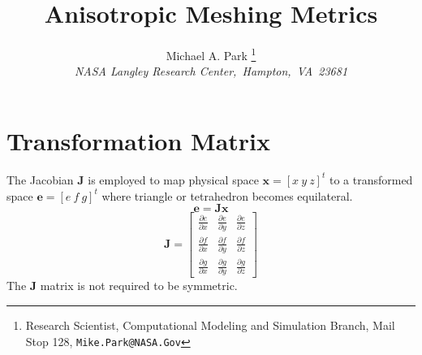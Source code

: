 \documentclass{article}
\title{Anisotropic Meshing Metrics}
\author{Michael A. Park
  \thanks{Research Scientist, Computational Modeling and Simulation Branch,
          Mail Stop 128, \texttt{Mike.Park@NASA.Gov}} \\
  {\itshape NASA Langley Research Center,~Hampton,~VA~23681}\\[5pt]
}
\begin{document}
\maketitle 

\section{Transformation Matrix}

The Jacobian $\mathbf{J}$ is employed to map physical space
$\mathbf{x}=\left[x ~y~z\right]^t$ to a transformed space
$\mathbf{e}=\left[e~f~g\right]^t$ where triangle or tetrahedron
becomes equilateral.
\begin{equation}\label{e:x}
 \mathbf{e}=\mathbf{J}\mathbf{x}
\end{equation}
\begin{equation}
 \mathbf{J}=\left[
 \begin{array}{ccc}
   \frac{\partial e}{\partial x}&
   \frac{\partial e}{\partial y}&
   \frac{\partial e}{\partial z}\\
   \frac{\partial f}{\partial x}&
   \frac{\partial f}{\partial y}&
   \frac{\partial f}{\partial z}\\
   \frac{\partial g}{\partial x}&
   \frac{\partial g}{\partial y}&
   \frac{\partial g}{\partial z}
 \end{array}\right]
\end{equation}
The $\mathbf{J}$ matrix is not required to be symmetric.
\end{document}
